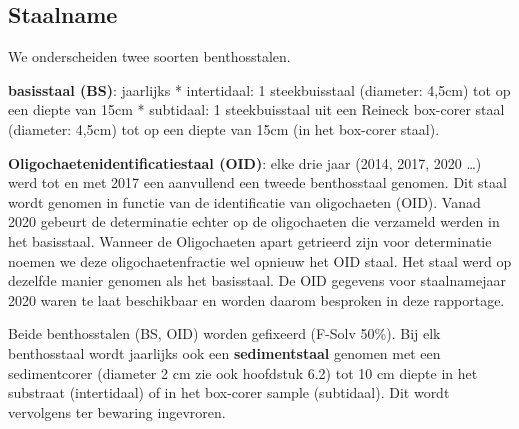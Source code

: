 \documentclass[twoside]{extreport}
\begin{document}
\begin{table}

\caption{\label{tab:070-staalnamelocaties}Aantal stalen per stratum in 2021.}
\centering
{}
\end{table}

\hypertarget{staalname}{%
\subsection{Staalname}\label{staalname}}

We onderscheiden twee soorten benthosstalen.

\textbf{basisstaal (BS)}: jaarlijks * intertidaal: 1 steekbuisstaal
(diameter: 4,5cm) tot op een diepte van 15cm * subtidaal: 1
steekbuisstaal uit een Reineck box-corer staal (diameter: 4,5cm) tot op
een diepte van 15cm (in het box-corer staal).

\textbf{Oligochaetenidentificatiestaal (OID)}: elke drie jaar (2014,
2017, 2020 \ldots) werd tot en met 2017 een aanvullend een tweede
benthosstaal genomen. Dit staal wordt genomen in functie van de
identificatie van oligochaeten (OID). Vanad 2020 gebeurt de determinatie
echter op de oligochaeten die verzameld werden in het basisstaal.
Wanneer de Oligochaeten apart getrieerd zijn voor determinatie noemen we
deze oligochaetenfractie wel opnieuw het OID staal. Het staal werd op
dezelfde manier genomen als het basisstaal. De OID gegevens voor
staalnamejaar 2020 waren te laat beschikbaar en worden daarom besproken
in deze rapportage.

Beide benthosstalen (BS, OID) worden gefixeerd (F-Solv 50\%). Bij elk
benthosstaal wordt jaarlijks ook een \textbf{sedimentstaal} genomen met
een sedimentcorer (diameter 2 cm zie ook hoofdstuk 6.2) tot 10 cm diepte
in het substraat (intertidaal) of in het box-corer sample (subtidaal).
Dit wordt vervolgens ter bewaring ingevroren.
\end{document}
